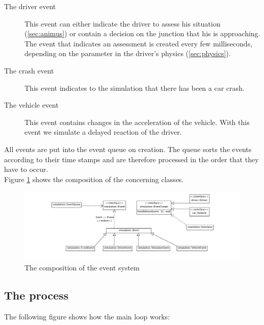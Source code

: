 \begin{description}
\item[The driver event] This event can either indicate the driver
to assess his situation (\ref{sec:animus}) or contain a decision on the 
junction that his is approaching. The event that indicates an assessment
is created every few milliseconds, depending on the parameter in the driver's
physics (\ref{sec:physics}).
\item[The crash event]
This event indicates to the simulation that there has been a car crash.
\item[The vehicle event]
This event contains changes in the acceleration of the vehicle. With this 
event we simulate a delayed reaction of the driver.
\end{description}

\noindent All events are put into the event queue on creation. The queue sorts the
events according to their time stamps and are therefore processed in the
order that they have to occur. \\

\noindent Figure \ref{fig:eventSystem} shows the composition of the 
concerning classes. \\

\begin{figure}[H]
\begin{center}
\includegraphics[width=\textwidth]{images/eventsystem.png}
\end{center}
\caption{The composition of the event system}
\label{fig:eventSystem}
\end{figure}

\subsection{The process}
\label{sec:process}

The following figure shows how the main loop works:

